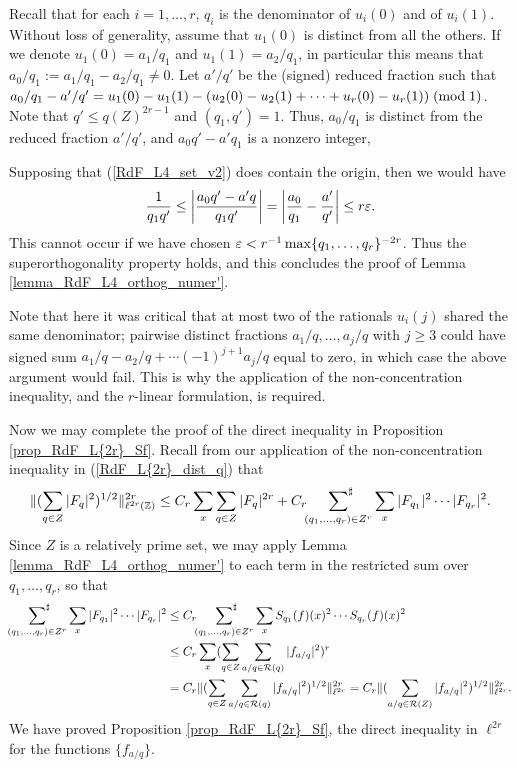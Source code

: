 \documentclass[oneside,11pt]{amsart}
\newcommand{\Rcal}{\mathcal{R}}
\begin{document}
Recall   that for each $i=1,\ldots, r$, $q_i$ is the denominator of $u_i(0)$ and of $u_i(1)$. 
Without loss of generality, assume  that $u_1(0)$ is distinct from all the others. If we denote $u_1(0)= a_1/q_1$ and $u_1(1) = a_2/q_1$, in particular this means that  $a_0/q_1:=a_1/q_1-a_2/q_1 \neq 0$.
Let $a'/q'$ be the (signed) reduced fraction such that 
$a_0/q_1 - a'/q' = u_1(0) - u_1(1) - (u_2(0) - u_2(1) + \cdots + u_{r}(0) -u_{r}(1)) \; ( \text{mod} \; 1)$.
Note that $q'  \leq q(Z)^{2r-1}$ and $(q_1,q')=1$.  
Thus,  $a_0/q_1$ is distinct from the reduced fraction $a'/q'$,  and $a_0q' - a'q_1$ is a nonzero integer,


Supposing that (\ref{RdF_L4_set_v2}) does contain the origin,  then we would have
\[ \frac{1}{q_1 q'} \leq \left| \frac{a_0q' - a'q}{q_1q'} \right| = \left| \frac{a_0}{q_1}  - \frac{a'}{q'} \right| \leq r\varepsilon.\]
This cannot occur if we have chosen $\varepsilon < r^{-1}\max \{q_1,\ldots,q_r\}^{-2r}$. Thus the superorthogonality property holds, and this concludes the proof of Lemma \ref{lemma_RdF_L4_orthog_numer'}.

\begin{remark}\label{remark_two_q}
Note that here it was critical that at most two of the rationals $u_i(j)$ shared the same denominator; pairwise distinct  fractions $a_1/q, \ldots ,a_j/q$ with $j \geq 3$ could have signed sum $a_1/q - a_2/q + \cdots (-1)^{j+1} a_j/q$ equal to zero, in which case the above argument would fail. This is why the application of the non-concentration inequality, and the $r$-linear formulation, is required.
\end{remark}
  
  Now we may complete the proof of the direct inequality in Proposition  \ref{prop_RdF_L{2r}_Sf}.
  Recall  from our application of the non-concentration inequality  in (\ref{RdF_L{2r}_dist_q}) that
\[  \| (\sum_{q \in Z} |F_q|^2)^{1/2} \|_{\ell^{2r}(\mathbb{Z})}^{2r} \leq C_r
\sum_x\sum_{q \in Z}  |F_q|^{2r} + C_r  \sideset{}{^\sharp}\sum_{(q_1,\ldots, q_r) \in Z^r}  \sum_x|F_{q_1}|^2 \cdots |F_{q_r}|^2.\]
Since $Z$ is a relatively prime set, we may apply Lemma \ref{lemma_RdF_L4_orthog_numer'} to each term in the restricted sum over $q_1,\ldots, q_r$, so that
\begin{align*}
 \sideset{}{^\sharp}\sum_{(q_1,\ldots, q_r )\in Z^r}  \sum_x|F_{q_1}|^2 \cdots |F_{q_r}|^2  
	&\leq  C_r  \sideset{}{^\sharp}\sum_{(q_1,\ldots, q_r) \in Z^r} \sum_x  S_{q_1}(f)(x)^2 \cdots S_{q_r}(f)(x)^2  \\
	& \leq C_r\sum_x ( \sum_{q  \in Z} \sum_{a/q \in \Rcal(q)} |f_{a/q}|^2)^r  \\
	& = C_r\| (\sum_{q  \in Z} \sum_{a/q \in \Rcal(q)} |f_{a/q}|^2)^{1/2} \|_{\ell^{2r}}^{2r} = C_r\| ( \sum_{a/q \in \Rcal(Z)} |f_{a/q}|^2)^{1/2} \|_{\ell^{2r}}^{2r}.
 \end{align*}
     We have proved Proposition \ref{prop_RdF_L{2r}_Sf}, the direct inequality in $\ell^{2r}$ for the functions $\{f_{a/q}\}$.
 
\end{document}
